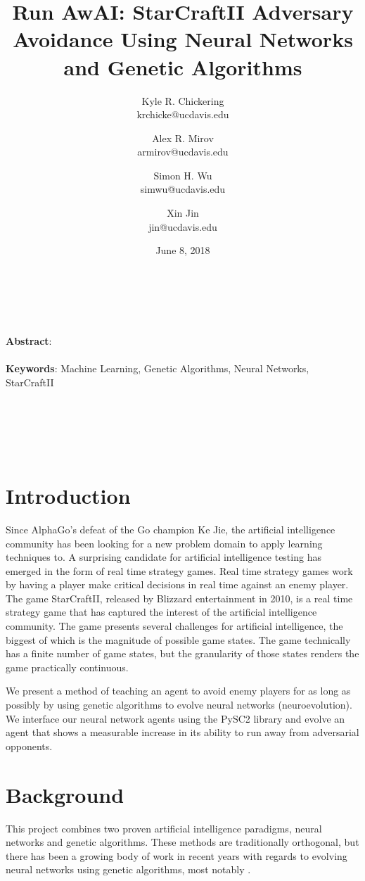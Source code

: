 \documentclass{article}
\title{Run AwAI: StarCraftII Adversary Avoidance Using Neural Networks and
  Genetic Algorithms}
\author{Kyle R. Chickering \\ krchicke@ucdavis.edu
  \and Alex R. Mirov \\ armirov@ucdavis.edu
  \and Simon H. Wu \\ simwu@ucdavis.edu
  \and Xin Jin \\ jin@ucdavis.edu}
\date{June 8, 2018}
\renewenvironment{abstract}
{
\begin{changemargin}{0.5in}{0.5in}
}
{
\end{changemargin}
}
\begin{document}
\maketitle
\hline
\\~\\

\begin{abstract}
  \textbf{Abstract}: \blindtext
  \\~\\
  \textbf{Keywords}: Machine Learning, Genetic Algorithms, Neural Networks,
  StarCraftII
\end{abstract}
\\~\\
\hline
\\~\\

\begin{multicols}{2}
\section{Introduction}
Since AlphaGo's defeat of the Go champion Ke Jie, the artificial intelligence
community has
been looking for a new problem domain to apply learning techniques to. A
surprising candidate for artificial intelligence testing has
emerged in the form of real time strategy games. Real time strategy games work
by having a player make critical decisions in real time against an enemy
player. The game StarCraftII, released by Blizzard entertainment in 2010, is a
real time strategy
game that has captured the interest of the artificial intelligence community.
The game presents several challenges for artificial intelligence, the biggest of
which is the magnitude of possible game states. The game technically has a
finite number of game states, but the granularity of those states renders the
game practically continuous.

We present a method of teaching an agent to avoid enemy players for as long as
possibly by using genetic algorithms to evolve neural networks (neuroevolution).
We interface our neural network agents using the PySC2 library and evolve an
agent that shows a measurable increase in its ability to run away from
adversarial opponents.

\section{Background}
This project combines two proven artificial intelligence paradigms, neural
networks and genetic algorithms. These methods are traditionally orthogonal,
but there has been a growing body of work in recent years with regards to
evolving neural networks using genetic algorithms, most notably \cite{NEAT}.


\end{multicols}
\end{document}
